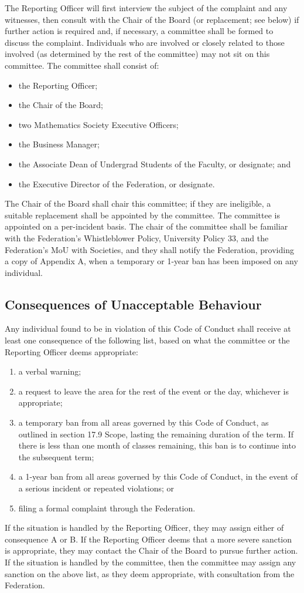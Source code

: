 The Reporting Officer will first interview the subject of the complaint and any witnesses, then consult with the Chair of the Board (or replacement; see below) if further action is required and, if necessary, a committee shall be formed to discuss the complaint. Individuals who are involved or closely related to those involved (as determined by the rest of the committee) may not sit on this committee. The committee shall consist of:
\begin{itemize}
	\item the Reporting Officer;
	\item the Chair of the Board;
	\item two Mathematics Society Executive Officers;
	\item the Business Manager;
	\item the Associate Dean of Undergrad Students of the Faculty, or designate; and
	\item the Executive Director of the Federation, or designate.
\end{itemize}
The Chair of the Board shall chair this committee; if they are ineligible, a suitable replacement shall be appointed by the committee. The committee is appointed on a per-incident basis. The chair of the committee shall be familiar with the Federation's Whistleblower Policy, University Policy 33, and the Federation's MoU with Societies, and they shall notify the Federation, providing a copy of Appendix A, when a temporary or 1-year ban has been imposed on any individual.

\subsection{Consequences of Unacceptable Behaviour}
Any individual found to be in violation of this Code of Conduct shall receive at least one consequence of the following list, based on what the committee or the Reporting Officer deems appropriate:
\begin{enumerate}[label=\Alph*.]
	\item a verbal warning;
	\item a request to leave the area for the rest of the event or the day, whichever is appropriate;
	\item a temporary ban from all areas governed by this Code of Conduct, as outlined in section 17.9 Scope, lasting the remaining duration of the term. If there is less than one month of classes remaining, this ban is to continue into the subsequent term;
	\item a 1-year ban from all areas governed by this Code of Conduct, in the event of a serious incident or repeated violations; or
	\item filing a formal complaint through the Federation.
\end{enumerate}
If the situation is handled by the Reporting Officer, they may assign either of consequence A or B. If the Reporting Officer deems that a more severe sanction is appropriate, they may contact the Chair of the Board to pursue further action. If the situation is handled by the committee, then the committee may assign any sanction on the above list, as they deem appropriate, with consultation from the Federation.

